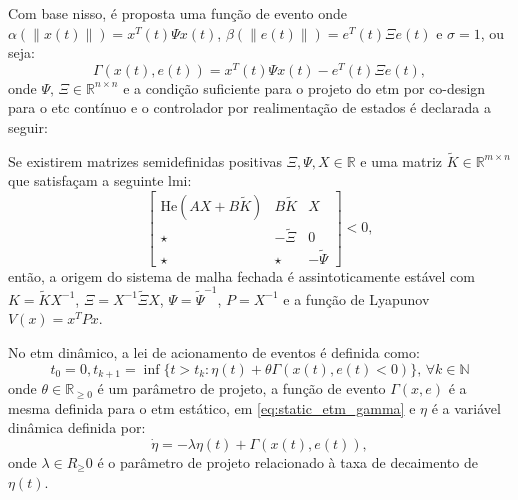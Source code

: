 Com base nisso, é proposta uma função de evento onde $\alpha(\|x(t)\|) = x^T(t)\Psi x(t)$, $\beta(\|e(t)\|) = e^T(t)\Xi e(t)$ e $\sigma = 1$, ou seja: \begin{equation}
  \Gamma(x(t), e(t)) = x^T(t)\Psi x(t) - e^T(t)\Xi e(t),
  \label{eq:static_etm_gamma}
\end{equation} onde $\Psi, \, \Xi \in \mathbb{R}^{n \times n}$ e a condição suficiente para o projeto do \acrshort{etm} por co-design para o \acrshort{etc} contínuo e o controlador por realimentação de estados é declarada a seguir:

\begin{theorem}
  \label{theorem:constraints-2}
  Se existirem matrizes semidefinidas positivas $\Xi, \Psi, X \in \mathbb{R}$ e uma matriz $\tilde{K} \in \mathbb{R}^{m \times n}$ que satisfaçam a seguinte \acrshort{lmi}:
  \begin{equation}
    \begin{bmatrix}
      \mathrm{He}(AX +B\tilde{K}) & B\tilde{K}   & X             \\
      \star              & -\tilde{\Xi} & 0             \\
      \star              & \star        & -\tilde{\Psi}
    \end{bmatrix} < 0,
    \label{eq:etm_lmi_1}
  \end{equation}
  então, a origem do sistema de malha fechada é assintoticamente estável com $K = \tilde{K}X^{-1}$, $\Xi= X^{-1}\tilde{\Xi}X$, $\Psi = \tilde{\Psi}^{-1}$, $P = X^{-1}$ e a função de Lyapunov $V(x)=x^TPx$.
\end{theorem}

No \acrshort{etm} dinâmico, a lei de acionamento de eventos é definida como: \begin{equation} t_0 = 0, t_{k+1} = \inf \{t > t_k : \eta(t) + \theta \Gamma(x(t), e(t) < 0) \}, \, \forall k \in \mathbb{N} \end{equation} onde $\theta \in \mathbb{R}_{\geq 0}$ é um parâmetro de projeto, a função de evento $\Gamma(x, e)$ é a mesma definida para o \acrshort{etm} estático, em \eqref{eq:static_etm_gamma} e $\eta$ é a variável dinâmica definida por: \begin{equation}  \dot{\eta} = - \lambda \eta(t) + \Gamma(x(t), e(t)), \label{eq:dynamic-etm}\end{equation} onde $\lambda \in R_{\geq} 0 $ é o parâmetro de projeto relacionado à taxa de decaimento de $\eta(t)$.

